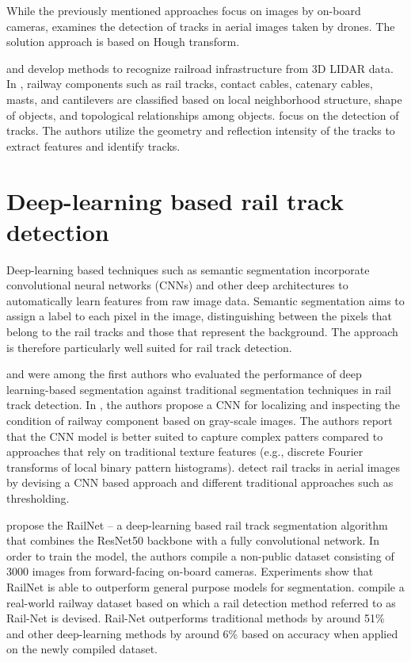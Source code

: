 \documentclass[Master,MDS,english]{BASE/twbook} %
\begin{document}
While the previously mentioned approaches focus on images by on-board cameras, \cite{7952544} examines the detection of tracks in aerial images taken by drones. The solution approach is based on Hough transform.

\cite{rs71114916} and \cite{6783695} develop methods to recognize railroad infrastructure from 3D LIDAR data.
In \cite{rs71114916}, railway components such as rail tracks, contact cables, catenary cables, masts, and cantilevers are classified based on local neighborhood structure, shape of objects, and topological relationships among objects. 
\cite{6783695} focus on the detection of tracks. The authors utilize the geometry and reflection intensity of the tracks to
extract features and identify tracks.


\section{Deep-learning based rail track detection}

Deep-learning based techniques such as semantic segmentation incorporate convolutional neural networks (CNNs) and other deep architectures to automatically learn features from raw image data. Semantic segmentation aims to assign a label to each pixel in the image, distinguishing between the pixels that belong to the rail tracks and those that represent the background. The approach is therefore particularly well suited for rail track detection. 

\cite{7350873} and \cite{8517865} were among the first authors who evaluated the performance of deep learning-based segmentation against traditional segmentation techniques in rail track detection. 
In \cite{7350873}, the authors propose a CNN for localizing and inspecting the condition of railway component based on gray-scale images. The authors report that the CNN model is better suited to capture complex patters compared to approaches that rely on traditional texture features (e.g., discrete Fourier transforms of local binary pattern histograms). 
\cite{8517865} detect rail tracks in aerial images by devising a CNN based approach and different traditional approaches such as thresholding. 

\cite{8859360} propose the RailNet -- a deep-learning based rail track segmentation algorithm that combines the ResNet50 backbone with a fully convolutional network. In order to train the model, the authors compile a non-public dataset consisting of 3000 images from forward-facing on-board cameras. Experiments show that RailNet is able to outperform general purpose models for segmentation.
\cite{10.1145/3503161.3548050} compile a real-world railway dataset based on which a rail detection method referred to as Rail-Net is devised. Rail-Net outperforms traditional methods by around 51\% and other deep-learning methods by around 6\% based on accuracy when applied on the newly compiled dataset. 
\end{document}
